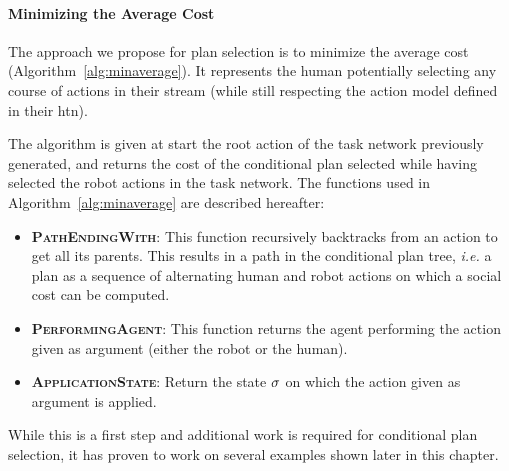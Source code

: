 \documentclass[a4paper,11pt,twoside]{StyleThese}
\begin{document}
\paragraph{Minimizing the Average Cost}
The approach we propose for plan selection is to minimize the average cost (Algorithm~\ref{alg:minaverage}). It represents the human potentially selecting any course of actions in their stream (while still respecting the action model defined in their \acrshort{htn}).

The algorithm is given at start the root action of the task network previously generated, and returns the cost of the conditional plan selected while having selected the robot actions in the task network. The functions used in Algorithm~\ref{alg:minaverage} are described hereafter:

\begin{itemize}
\item \textbf{\textsc{PathEndingWith}}: This function recursively backtracks from an action to get all its parents. This results in a path in the conditional plan tree, \textit{i.e.} a plan as a sequence of alternating human and robot actions on which a social cost can be computed.

\item \textbf{\textsc{PerformingAgent}}: This function returns the agent performing the action given as argument (either the robot or the human).

\item \textbf{\textsc{ApplicationState}}: Return the state $\sigma$ on which the action given as argument is applied.
\end{itemize}

While this is a first step and additional work is required for conditional plan selection, it has proven to work on several examples shown later in this chapter.
\end{document}
